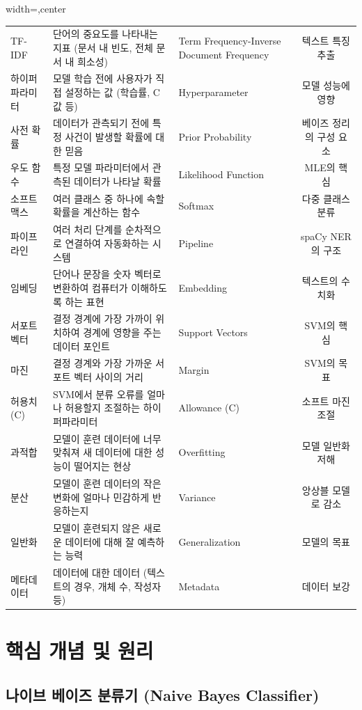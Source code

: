 \documentclass[11pt,a4paper]{article}
\theoremstyle{definition}
\begin{document}
\begin{adjustbox}{width=\textwidth,center}
\begin{tabular}{lllc}
TF-IDF & 단어의 중요도를 나타내는 지표 (문서 내 빈도, 전체 문서 내 희소성) & Term Frequency-Inverse Document Frequency & 텍스트 특징 추출 \\
하이퍼파라미터 & 모델 학습 전에 사용자가 직접 설정하는 값 (학습률, C 값 등) & Hyperparameter & 모델 성능에 영향 \\
사전 확률 & 데이터가 관측되기 전에 특정 사건이 발생할 확률에 대한 믿음 & Prior Probability & 베이즈 정리의 구성 요소 \\
우도 함수 & 특정 모델 파라미터에서 관측된 데이터가 나타날 확률 & Likelihood Function & MLE의 핵심 \\
소프트맥스 & 여러 클래스 중 하나에 속할 확률을 계산하는 함수 & Softmax & 다중 클래스 분류 \\
파이프라인 & 여러 처리 단계를 순차적으로 연결하여 자동화하는 시스템 & Pipeline & spaCy NER의 구조 \\
임베딩 & 단어나 문장을 숫자 벡터로 변환하여 컴퓨터가 이해하도록 하는 표현 & Embedding & 텍스트의 수치화 \\
서포트 벡터 & 결정 경계에 가장 가까이 위치하여 경계에 영향을 주는 데이터 포인트 & Support Vectors & SVM의 핵심 \\
마진 & 결정 경계와 가장 가까운 서포트 벡터 사이의 거리 & Margin & SVM의 목표 \\
허용치 (C) & SVM에서 분류 오류를 얼마나 허용할지 조절하는 하이퍼파라미터 & Allowance (C) & 소프트 마진 조절 \\
과적합 & 모델이 훈련 데이터에 너무 맞춰져 새 데이터에 대한 성능이 떨어지는 현상 & Overfitting & 모델 일반화 저해 \\
분산 & 모델이 훈련 데이터의 작은 변화에 얼마나 민감하게 반응하는지 & Variance & 앙상블 모델로 감소 \\
일반화 & 모델이 훈련되지 않은 새로운 데이터에 대해 잘 예측하는 능력 & Generalization & 모델의 목표 \\
메타데이터 & 데이터에 대한 데이터 (텍스트의 경우, 개체 수, 작성자 등) & Metadata & 데이터 보강 \\
\bottomrule
\end{tabular}
\end{adjustbox}

\newpage
\section{핵심 개념 및 원리}

\subsection{나이브 베이즈 분류기 (Naive Bayes Classifier)}
\end{document}

